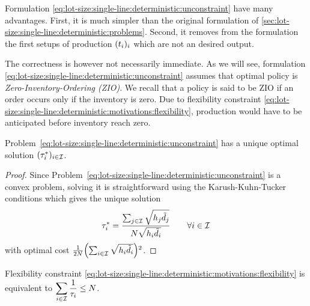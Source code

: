 Formulation \eqref{eq:lot-size:single-line:deterministic:unconstraint} have many advantages.
First, it is much simpler than the original formulation of \cref{sec:lot-size:single-line:deterministic:problems}.
Second, it removes from the formulation the first setups of production $\bracket{t_i}_i$ which are not an desired output.


The correctness is however not necessarily immediate.
As we will see, formulation \eqref{eq:lot-size:single-line:deterministic:unconstraint} assumes that optimal policy is \emph{Zero-Inventory-Ordering (ZIO)}.
We recall that a policy is said to be ZIO if an order occurs only if the inventory is zero.
Due to flexibility constraint \eqref{eq:lot-size:single-line:deterministic:motivations:flexibility}, production would have to be anticipated before inventory reach zero.




\begin{lem}\label{lem:lot-size:single-line:deterministic:unconstraint:optimality}
Problem~\eqref{eq:lot-size:single-line:deterministic:unconstraint} has a unique optimal solution $(\tau_i^*)_{i\in\mathcal{I}}$.
\end{lem}


\begin{proof}
Since Problem~\eqref{eq:lot-size:single-line:deterministic:unconstraint} is a convex problem, solving it is straightforward using the Karush-Kuhn-Tucker conditions which gives the unique solution
\begin{equation}
  \tau_i^*= \frac{\sum_{j\in\mathcal{I}}\sqrt{h_j\tilde{d}_j}}{N\sqrt{h_i\tilde{d}_i}}\qquad\forall i\in\mathcal{I}
\end{equation}
with optimal cost $\frac{1}{2\nbsetups}\bracket{\sum_{i\in\REF}\sqrt{\holding_i\tilde{\demand_i}}}^2$.
\end{proof}



\begin{lem}\label{lem:lot-size:single-line:models:average-setup}
Flexibility constraint \eqref{eq:lot-size:single-line:deterministic:motivations:flexibility} is equivalent to
$\displaystyle\sum_{i\in\mathcal{I}} \frac{1}{\tau_i} \le N$.
\end{lem}


